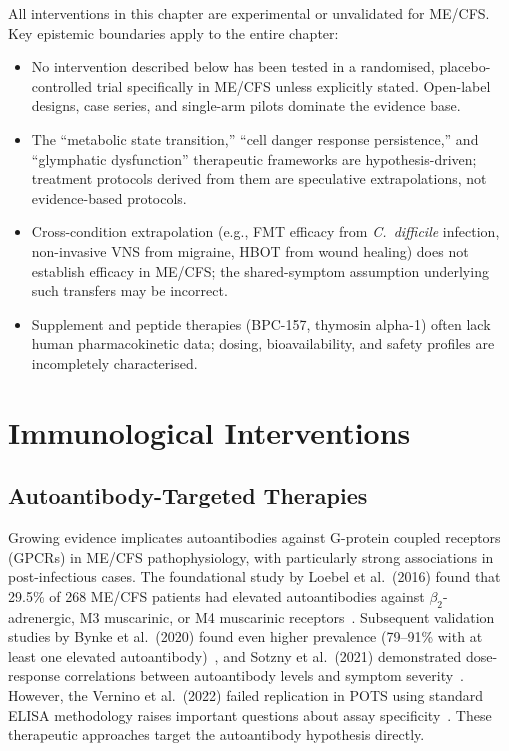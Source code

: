 \begin{limitation}
All interventions in this chapter are experimental or unvalidated for ME/CFS. Key epistemic boundaries apply to the entire chapter:
\begin{itemize}
    \item No intervention described below has been tested in a randomised, placebo-controlled trial specifically in ME/CFS unless explicitly stated. Open-label designs, case series, and single-arm pilots dominate the evidence base.
    \item The ``metabolic state transition,'' ``cell danger response persistence,'' and ``glymphatic dysfunction'' therapeutic frameworks are hypothesis-driven; treatment protocols derived from them are speculative extrapolations, not evidence-based protocols.
    \item Cross-condition extrapolation (e.g., FMT efficacy from \textit{C.~difficile} infection, non-invasive VNS from migraine, HBOT from wound healing) does not establish efficacy in ME/CFS; the shared-symptom assumption underlying such transfers may be incorrect.
    \item Supplement and peptide therapies (BPC-157, thymosin alpha-1) often lack human pharmacokinetic data; dosing, bioavailability, and safety profiles are incompletely characterised.
\end{itemize}
\end{limitation}

\section{Immunological Interventions}
\label{sec:immunological-interventions}

\subsection{Autoantibody-Targeted Therapies}

Growing evidence implicates autoantibodies against G-protein coupled receptors (GPCRs) in ME/CFS pathophysiology, with particularly strong associations in post-infectious cases. The foundational study by Loebel et al.\ (2016) found that 29.5\% of 268 ME/CFS patients had elevated autoantibodies against $\beta_2$-adrenergic, M3 muscarinic, or M4 muscarinic receptors~\cite{Loebel2016}. Subsequent validation studies by Bynke et al.\ (2020) found even higher prevalence (79--91\% with at least one elevated autoantibody)~\cite{Bynke2020}, and Sotzny et al.\ (2021) demonstrated dose-response correlations between autoantibody levels and symptom severity~\cite{Sotzny2021}. However, the Vernino et al.\ (2022) failed replication in POTS using standard ELISA methodology raises important questions about assay specificity~\cite{POTS2022failed_replication}. These therapeutic approaches target the autoantibody hypothesis directly.

